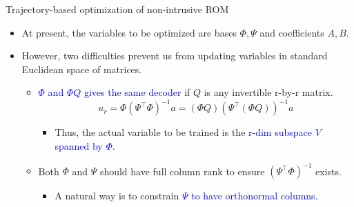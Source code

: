 \documentclass[presentation]{beamer}
\begin{document}
\begin{frame}[label={sec:orgd97de61}]{Trajectory-based optimization of non-intrusive ROM}
\begin{itemize}[<+->]
\item At present, the variables to be optimized are bases \(\Phi, \Psi\) and coefficients \(A, B\).
\item However, two difficulties prevent us from updating variables in standard Euclidean space of matrices.
\begin{itemize}
\item \textcolor{blue}{$\Phi$ and $\Phi Q$ gives the same decoder} if \(Q\) is any invertible r-by-r matrix.
\begin{equation}
  \label{eq:4}
  u_{r} = \Phi(\Psi^{\top}\Phi)^{-1}a = (\Phi Q)(\Psi^{\top}(\Phi Q))^{-1}a 
\end{equation}
\begin{itemize}
\item Thus, the actual variable to be trained is the \textcolor{blue}{r-dim subspace $V$ spanned by $\Phi$}.
\end{itemize}
\item Both \(\Phi\) and \(\Psi\) should have full column rank to ensure \((\Psi^{\top}\Phi)^{-1}\) exists.
\begin{itemize}
\item A natural way is to constrain \textcolor{blue}{$\Psi$ to have orthonormal columns.}
\end{itemize}
\end{itemize}
\end{itemize}
\end{frame}
\end{document}
